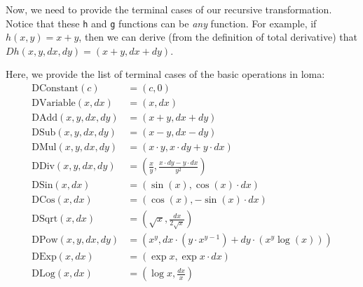 Now, we need to provide the terminal cases of our recursive transformation. Notice that these \lstinline{h} and \lstinline{g} functions can be \emph{any} function. For example, if $h(x, y) = x + y$, then we can derive (from the definition of total derivative) that $Dh(x, y, dx, dy) = (x + y, dx + dy)$. 

Here, we provide the list of terminal cases of the basic operations in loma:
\begin{equation}
\begin{aligned}
\text{DConstant}(c) &= (c, 0) \\
\text{DVariable}(x, dx) &= (x, dx) \\
\text{DAdd}(x, y, dx, dy) &= (x + y, dx + dy) \\
\text{DSub}(x, y, dx, dy) &= (x - y, dx - dy) \\
\text{DMul}(x, y, dx, dy) &= (x \cdot y, x \cdot dy + y \cdot dx) \\
\text{DDiv}(x, y, dx, dy) &= \left(\frac{x}{y}, \frac{x \cdot dy - y \cdot dx}{y^2}\right) \\
\text{DSin}(x, dx) &= \left(\sin(x), \cos(x) \cdot dx\right) \\
\text{DCos}(x, dx) &= \left(\cos(x), -\sin(x) \cdot dx\right) \\
\text{DSqrt}(x, dx) &= \left(\sqrt{x}, \frac{dx}{2\sqrt{x}}\right) \\
\text{DPow}(x, y, dx, dy) &= \left(x^y, dx \cdot \left(y \cdot x^{y-1}\right) + dy \cdot \left(x^y \log(x)\right)\right) \\
\text{DExp}(x, dx) &= \left(\exp{x}, \exp{x} \cdot dx\right) \\
\text{DLog}(x, dx) &= \left(\log{x}, \frac{dx}{x}\right) \\
\end{aligned}
\end{equation}



